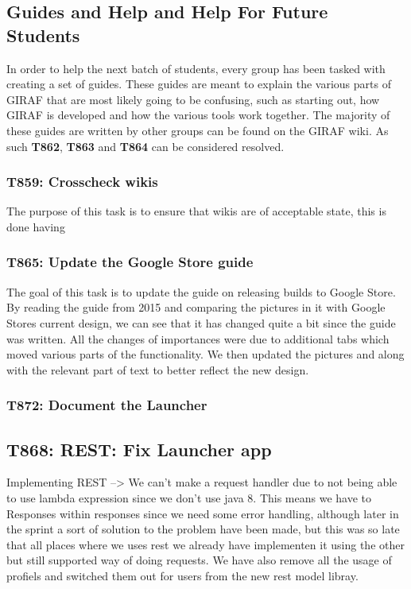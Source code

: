 \subsection{Guides and Help and Help For Future Students}
In order to help the next batch of students, every group has been tasked with
creating a set of guides. These guides are meant to explain the various
parts of GIRAF that are most likely going to be confusing, such as starting out,
how GIRAF is developed and how the various tools work together. The
majority of these guides are written by other groups can be found on the GIRAF
wiki\citep{GWiki}. As such \textbf{T862}, \textbf{T863} and \textbf{T864} can be
considered resolved.

\subsubsection{T859: Crosscheck wikis}
The purpose of this task is to ensure that wikis are of acceptable state, this
is done having

\subsubsection{T865: Update the Google Store guide}

The goal of this task is to update the guide on releasing builds to Google
Store. By reading the guide from 2015 and comparing the pictures in it with
Google Stores current design, we can see that it has changed quite a bit since
the guide was written. All the changes of importances were due to additional
tabs which moved various parts of the functionality. We then updated the
pictures and along with the relevant part of text to better reflect the new
design.

\subsubsection{T872: Document the Launcher}

\subsection{T868: REST: Fix Launcher app}
Implementing REST --> We can't make a request handler due to not being able
to use lambda expression since we don't use java 8.
This means we have to Responses within responses since we need some error
handling, although later in the sprint a sort of solution to the problem have
been made, but this was so late that all places where we uses rest we already
have implementen it using the other but still supported way of doing requests.
We have also remove all the usage of profiels and switched them out for users
from the new rest model libray.

